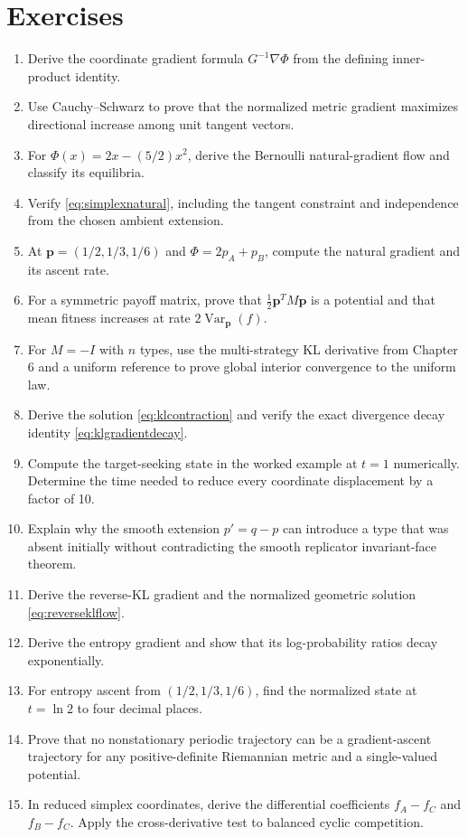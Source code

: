 \documentclass[11pt,oneside,openany]{book}
\theoremstyle{definition}
\theoremstyle{remark}
\newenvironment{exercises}{\begin{enumerate}[label=\thechapter.\arabic*,ref=\thechapter.\arabic*,leftmargin=2.8em,itemsep=6pt]}{\end{enumerate}}
\newcommand{\Var}{\operatorname{Var}}
\newcommand{\p}{\mathbf{p}}
\numberwithin{equation}{chapter}
\begin{document}
\section{Exercises}
\begin{exercises}
\item Derive the coordinate gradient formula $G^{-1}\nabla\Phi$ from the defining inner-product identity.
\item Use Cauchy--Schwarz to prove that the normalized metric gradient maximizes directional increase among unit tangent vectors.
\item For $\Phi(x)=2x-(5/2)x^2$, derive the Bernoulli natural-gradient flow and classify its equilibria.
\item Verify \eqref{eq:simplexnatural}, including the tangent constraint and independence from the chosen ambient extension.
\item At $\p=(1/2,1/3,1/6)$ and $\Phi=2p_A+p_B$, compute the natural gradient and its ascent rate.
\item For a symmetric payoff matrix, prove that $\tfrac12\p^TM\p$ is a potential and that mean fitness increases at rate $2\Var_\p(f)$.
\item For $M=-I$ with $n$ types, use the multi-strategy KL derivative from Chapter 6 and a uniform reference to prove global interior convergence to the uniform law.
\item Derive the solution \eqref{eq:klcontraction} and verify the exact divergence decay identity \eqref{eq:klgradientdecay}.
\item Compute the target-seeking state in the worked example at $t=1$ numerically. Determine the time needed to reduce every coordinate displacement by a factor of 10.
\item Explain why the smooth extension $p'=q-p$ can introduce a type that was absent initially without contradicting the smooth replicator invariant-face theorem.
\item Derive the reverse-KL gradient and the normalized geometric solution \eqref{eq:reverseklflow}.
\item Derive the entropy gradient and show that its log-probability ratios decay exponentially.
\item For entropy ascent from $(1/2,1/3,1/6)$, find the normalized state at $t=\ln2$ to four decimal places.
\item Prove that no nonstationary periodic trajectory can be a gradient-ascent trajectory for any positive-definite Riemannian metric and a single-valued potential.
\item In reduced simplex coordinates, derive the differential coefficients $f_A-f_C$ and $f_B-f_C$. Apply the cross-derivative test to balanced cyclic competition.

\end{exercises}
\end{document}
